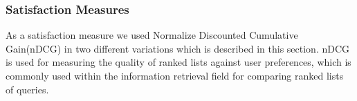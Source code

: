 \subsubsection{Satisfaction Measures}\label{sec:satisfactionmeasures}
As a satisfaction measure we used Normalize Discounted Cumulative Gain(nDCG) in two different variations which is described in this section. nDCG is used for measuring the quality of ranked lists against user preferences, which is commonly used within the information retrieval field for comparing ranked lists of queries\cite{ndcg}.


